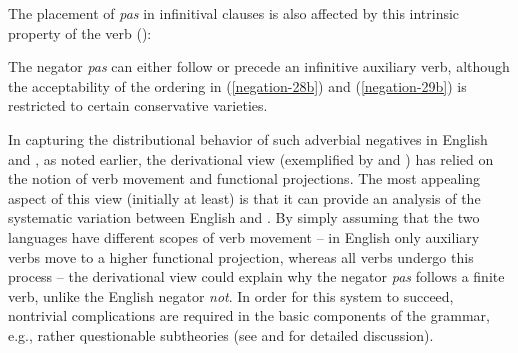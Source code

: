 \documentclass[output=paper
	        ,collection
	        ,collectionchapter
 	        ,biblatex
                ,babelshorthands
                ,newtxmath
                ,draftmode
                ,colorlinks, citecolor=brown
]{langscibook}
\begin{document}
\begin{exe}
\begin{xlist}
\begin{exe}
\begin{xlist}
\eal
{} \label{negation-6a}
 \label{negation-6b}
 \label{negation-6c}
\zl

\noindent
The placement of \textit{pas} in  infinitival
clauses is also affected by this intrinsic property of
the verb (\citealp[]{KS:02}):

\eal
{}
 \label{negation-28b}
\zl

\eal
{}
 \label{negation-29b}
\zl

\noindent
The negator \textit{pas} can either follow or precede an infinitive
auxiliary verb, although the acceptability of the
ordering in (\ref{negation-28b}) and (\ref{negation-29b}) is restricted to certain conservative
varieties.

In capturing the distributional behavior of such adverbial negatives
in English and , as noted earlier, the derivational view (exemplified by \citealt{Pollock:89} and \citealt{Chomsky:91})
has relied on the notion of verb
movement and functional projections.  The most appealing aspect of this
view (initially at least) is that it can provide an analysis of the
systematic variation
between English and . By simply assuming that the
two languages have different scopes of verb movement -- in English
only auxiliary verbs move to a higher functional projection, whereas
all  verbs undergo this process -- the derivational
view could explain why the  negator \textit{pas} follows
a finite verb, unlike the English negator \textit{not}.  In order for this system to succeed,
nontrivial complications are required in the basic components of the
grammar, e.g., rather questionable subtheories (see \citealt[Chapter~3]{Kim:00} and \citealt{KS:02}
for detailed discussion).


\end{xlist}
\end{exe}
\end{xlist}
\end{exe}
\end{document}
